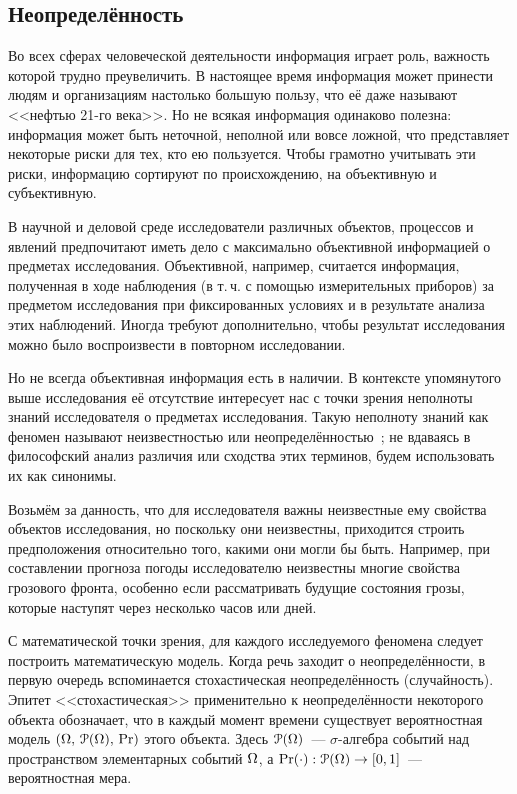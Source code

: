 
\subsection{Неопределённость}
\label{sec:intro_uncertainty}

Во всех сферах человеческой деятельности информация играет роль, важность которой трудно преувеличить. В настоящее время информация  может принести людям и организациям настолько большую пользу, что её даже называют <<нефтью 21-го века>>. Но не всякая информация одинаково полезна: информация может быть неточной, неполной или вовсе ложной, что представляет некоторые риски для тех, кто ею пользуется. Чтобы грамотно учитывать эти риски, информацию сортируют по происхождению, на объективную и субъективную.

В научной и деловой среде исследователи различных объектов, процессов и явлений предпочитают иметь дело с максимально объективной информацией о предметах исследования. Объективной, например, считается информация, полученная в ходе наблюдения (в т.\,ч. с помощью измерительных приборов) за предметом исследования при фиксированных условиях и в результате анализа этих наблюдений. Иногда требуют дополнительно, чтобы результат исследования можно было воспроизвести в повторном исследовании. 
  
Но не всегда объективная информация есть в наличии. В контексте упомянутого выше исследования её отсутствие интересует нас с точки зрения неполноты знаний исследователя о предметах исследования. Такую неполноту знаний как феномен называют неизвестностью или неопределённостью~\cite{falomkina}; не вдаваясь в философский анализ различия или сходства этих терминов, будем использовать их как синонимы.  

Возьмём за данность, что для исследователя важны неизвестные ему свойства объектов исследования, но поскольку они неизвестны, приходится строить предположения относительно того, какими они могли бы быть. Например, при составлении прогноза погоды исследователю неизвестны многие свойства грозового фронта, особенно если рассматривать будущие состояния грозы, которые наступят через несколько часов или дней.

С математической точки зрения, для каждого исследуемого феномена следует построить математическую модель.  Когда речь заходит о неопределённости, в первую очередь вспоминается стохастическая неопределённость (случайность). Эпитет <<стохастическая>> применительно к неопределённости некоторого объекта обозначает, что в каждый момент времени существует вероятностная модель ${(\Omega,\,{\EuScript P}(\Omega),\,{\mathrm{Pr}})}$ этого объекта. Здесь ${\EuScript P}(\Omega)$~--- $\sigma$-алгебра событий над пространством элементарных событий $\Omega$, а ${\mathrm{Pr}}(\cdot):  {\EuScript P}(\Omega) \to [0,1]$~--- вероятностная мера. 

